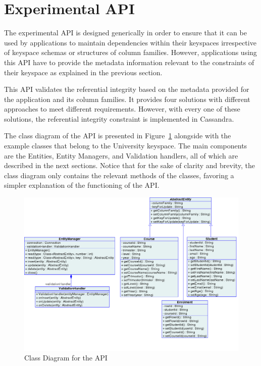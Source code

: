 \section{Experimental API}\label{s:implementation-API}

The experimental \ac{API} is designed generically in order to ensure
that it can be used by  applications to maintain dependencies within their
keyspaces irrespective of keyspace schemas or structures of column
families. However, applications using this \ac{API}  have to provide
 the metadata information relevant to the constraints of their keyspace as
 explained in the previous section. 

This \ac{API} validates the referential integrity based on the metadata provided
for the application and its column families.  It  provides  four solutions
with different approaches to meet different requirements. However, with 
 every one of these solutions,  the referential integrity constraint is
 implemented in Cassandra.

The  class diagram of the \ac{API} is presented  in
 Figure~\ref{f:classDiagram} alongside with the example classes that belong to 
the University keyspace. The main components are the Entities, Entity Managers,
and Validation handlers, all of which are described in the next sections.  
 Notice that for the sake of clarity and brevity,  the class diagram only
 contains  the relevant  methods of the classes, favoring a simpler
explanation of the functioning of the \ac{API}.

\begin{figure}[h]   
	\centering
	\includegraphics[width=\textwidth]{./figure/Solutions/FinalClassDiagram.png}
	\caption{Class Diagram for the \ac{API}}\label{f:classDiagram}
\end{figure}



